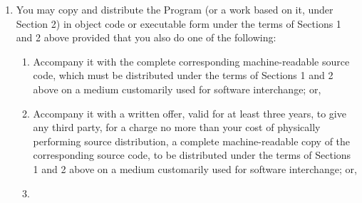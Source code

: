 \documentclass{book}
\begin{document}
{\begin{enumerate}
\begin{enumerate}
\end{enumerate}


These requirements apply to the modified work as a whole.  If
identifiable sections of that work are not derived from the Program,
and can be reasonably considered independent and separate works in
themselves, then this License, and its terms, do not apply to those
sections when you distribute them as separate works.  But when you
distribute the same sections as part of a whole which is a work based
on the Program, the distribution of the whole must be on the terms of
this License, whose permissions for other licensees extend to the
entire whole, and thus to each and every part regardless of who wrote it.

Thus, it is not the intent of this section to claim rights or contest
your rights to work written entirely by you; rather, the intent is to
exercise the right to control the distribution of derivative or
collective works based on the Program.

In addition, mere aggregation of another work not based on the Program
with the Program (or with a work based on the Program) on a volume of
a storage or distribution medium does not bring the other work under
the scope of this License.

\item
You may copy and distribute the Program (or a work based on it,
under Section 2) in object code or executable form under the terms of
Sections 1 and 2 above provided that you also do one of the following:

\begin{enumerate}

\item

Accompany it with the complete corresponding machine-readable
source code, which must be distributed under the terms of Sections
1 and 2 above on a medium customarily used for software interchange; or,

\item

Accompany it with a written offer, valid for at least three
years, to give any third party, for a charge no more than your
cost of physically performing source distribution, a complete
machine-readable copy of the corresponding source code, to be
distributed under the terms of Sections 1 and 2 above on a medium
customarily used for software interchange; or,

\item


\end{enumerate}
\end{enumerate}}
\end{document}

